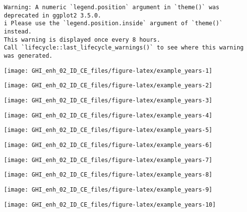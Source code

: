 \documentclass[
  10pt,
  a4paper,oneside]{article}
\begin{document}
\begin{verbatim}
Warning: A numeric `legend.position` argument in `theme()` was deprecated in ggplot2 3.5.0.
i Please use the `legend.position.inside` argument of `theme()` instead.
This warning is displayed once every 8 hours.
Call `lifecycle::last_lifecycle_warnings()` to see where this warning was generated.
\end{verbatim}

\begin{center}\texttt{[image: GHI\_enh\_02\_ID\_CE\_files/figure-latex/example\_years-1]} \end{center}

\begin{center}\texttt{[image: GHI\_enh\_02\_ID\_CE\_files/figure-latex/example\_years-2]} \end{center}

\begin{center}\texttt{[image: GHI\_enh\_02\_ID\_CE\_files/figure-latex/example\_years-3]} \end{center}

\begin{center}\texttt{[image: GHI\_enh\_02\_ID\_CE\_files/figure-latex/example\_years-4]} \end{center}

\begin{center}\texttt{[image: GHI\_enh\_02\_ID\_CE\_files/figure-latex/example\_years-5]} \end{center}

\begin{center}\texttt{[image: GHI\_enh\_02\_ID\_CE\_files/figure-latex/example\_years-6]} \end{center}

\begin{center}\texttt{[image: GHI\_enh\_02\_ID\_CE\_files/figure-latex/example\_years-7]} \end{center}

\begin{center}\texttt{[image: GHI\_enh\_02\_ID\_CE\_files/figure-latex/example\_years-8]} \end{center}

\begin{center}\texttt{[image: GHI\_enh\_02\_ID\_CE\_files/figure-latex/example\_years-9]} \end{center}

\begin{center}\texttt{[image: GHI\_enh\_02\_ID\_CE\_files/figure-latex/example\_years-10]} \end{center}
\end{document}
